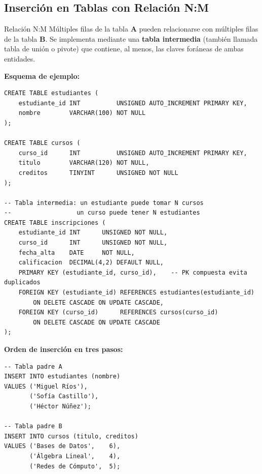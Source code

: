 \subsection{Inserción en Tablas con Relación N:M}

\begin{definicion}{Relación N:M}
  Múltiples filas de la tabla \textbf{A} pueden relacionarse con múltiples
  filas de la tabla \textbf{B}. Se implementa mediante una
  \textbf{tabla intermedia} (también llamada tabla de unión o pivote) que
  contiene, al menos, las claves foráneas de ambas entidades.
\end{definicion}

\textbf{Esquema de ejemplo:}

\begin{lstlisting}[style=sql, caption={Tablas con relación N:M — estudiantes y cursos}]
CREATE TABLE estudiantes (
    estudiante_id INT          UNSIGNED AUTO_INCREMENT PRIMARY KEY,
    nombre        VARCHAR(100) NOT NULL
);

CREATE TABLE cursos (
    curso_id      INT          UNSIGNED AUTO_INCREMENT PRIMARY KEY,
    titulo        VARCHAR(120) NOT NULL,
    creditos      TINYINT      UNSIGNED NOT NULL
);

-- Tabla intermedia: un estudiante puede tomar N cursos
--                  un curso puede tener N estudiantes
CREATE TABLE inscripciones (
    estudiante_id INT      UNSIGNED NOT NULL,
    curso_id      INT      UNSIGNED NOT NULL,
    fecha_alta    DATE     NOT NULL,
    calificacion  DECIMAL(4,2) DEFAULT NULL,
    PRIMARY KEY (estudiante_id, curso_id),    -- PK compuesta evita duplicados
    FOREIGN KEY (estudiante_id) REFERENCES estudiantes(estudiante_id)
        ON DELETE CASCADE ON UPDATE CASCADE,
    FOREIGN KEY (curso_id)      REFERENCES cursos(curso_id)
        ON DELETE CASCADE ON UPDATE CASCADE
);
\end{lstlisting}

\textbf{Orden de inserción en tres pasos:}

\begin{lstlisting}[style=sql, caption={Paso 1 — poblar ambas tablas padre}]
-- Tabla padre A
INSERT INTO estudiantes (nombre)
VALUES ('Miguel Ríos'),
       ('Sofía Castillo'),
       ('Héctor Núñez');

-- Tabla padre B
INSERT INTO cursos (titulo, creditos)
VALUES ('Bases de Datos',    6),
       ('Álgebra Lineal',    4),
       ('Redes de Cómputo',  5);
\end{lstlisting}

